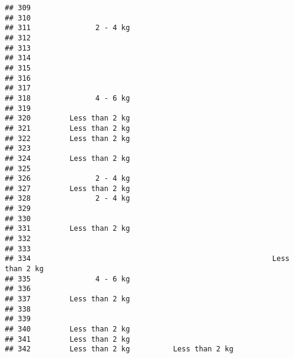 \documentclass[
]{article}
\begin{document}
\begin{verbatim}
## 309                                                                      
## 310                                                                      
## 311               2 - 4 kg                                               
## 312                                                                      
## 313                                                                      
## 314                                                                      
## 315                                                                      
## 316                                                                      
## 317                                                                      
## 318               4 - 6 kg                                               
## 319                                                                      
## 320         Less than 2 kg                                               
## 321         Less than 2 kg                                               
## 322         Less than 2 kg                                               
## 323                                                                      
## 324         Less than 2 kg                                               
## 325                                                                      
## 326               2 - 4 kg                                               
## 327         Less than 2 kg                                               
## 328               2 - 4 kg                                               
## 329                                                                      
## 330                                                                      
## 331         Less than 2 kg                                               
## 332                                                                      
## 333                                                                      
## 334                                                        Less than 2 kg
## 335               4 - 6 kg                                               
## 336                                                                      
## 337         Less than 2 kg                                               
## 338                                                                      
## 339                                                                      
## 340         Less than 2 kg                                               
## 341         Less than 2 kg                                               
## 342         Less than 2 kg          Less than 2 kg                       

\end{verbatim}
\end{document}
